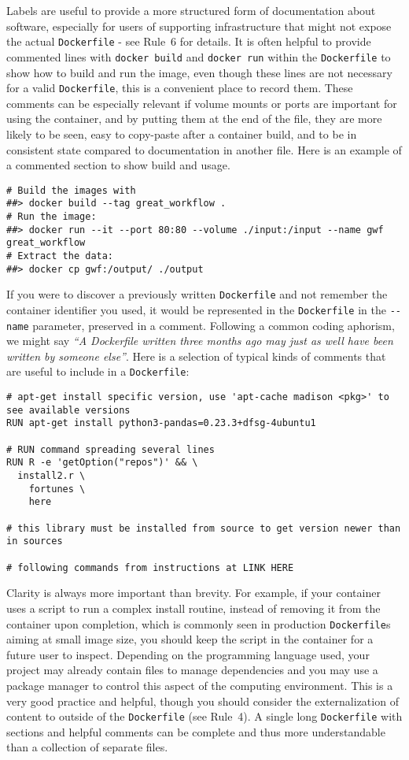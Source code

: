 \documentclass[10pt,letterpaper]{article}
\begin{document}
Labels are useful to provide a more structured form of documentation
about software, especially for users of supporting infrastructure that
might not expose the actual \texttt{Dockerfile} - see Rule~6 for
details. It is often helpful to provide commented lines with
\texttt{docker\ build} and \texttt{docker\ run} within the
\texttt{Dockerfile} to show how to build and run the image, even though
these lines are not necessary for a valid \texttt{Dockerfile}, this is a
convenient place to record them. These comments can be especially
relevant if volume mounts or ports are important for using the
container, and by putting them at the end of the file, they are more
likely to be seen, easy to copy-paste after a container build, and to be
in consistent state compared to documentation in another file. Here is
an example of a commented section to show build and usage.

\begin{verbatim}
# Build the images with
##> docker build --tag great_workflow .
# Run the image:
##> docker run --it --port 80:80 --volume ./input:/input --name gwf great_workflow
# Extract the data:
##> docker cp gwf:/output/ ./output
\end{verbatim}

If you were to discover a previously written \texttt{Dockerfile} and not
remember the container identifier you used, it would be represented in
the \texttt{Dockerfile} in the \texttt{-\/-name} parameter, preserved in
a comment. Following a common coding aphorism, we might say \emph{``A
Dockerfile written three months ago may just as well have been written
by someone else''}. Here is a selection of typical kinds of comments
that are useful to include in a \texttt{Dockerfile}:

\begin{verbatim}
# apt-get install specific version, use 'apt-cache madison <pkg>' to see available versions
RUN apt-get install python3-pandas=0.23.3+dfsg-4ubuntu1

# RUN command spreading several lines
RUN R -e 'getOption("repos")' && \
  install2.r \
    fortunes \
    here

# this library must be installed from source to get version newer than in sources

# following commands from instructions at LINK HERE
\end{verbatim}

Clarity is always more important than brevity. For example, if your
container uses a script to run a complex install routine, instead of
removing it from the container upon completion, which is commonly seen
in production \texttt{Dockerfile}s aiming at small image size, you
should keep the script in the container for a future user to inspect.
Depending on the programming language used, your project may already
contain files to manage dependencies and you may use a package manager
to control this aspect of the computing environment. This is a very good
practice and helpful, though you should consider the externalization of
content to outside of the \texttt{Dockerfile} (see Rule~4). A single
long \texttt{Dockerfile} with sections and helpful comments can be
complete and thus more understandable than a collection of separate
files.
\end{document}
